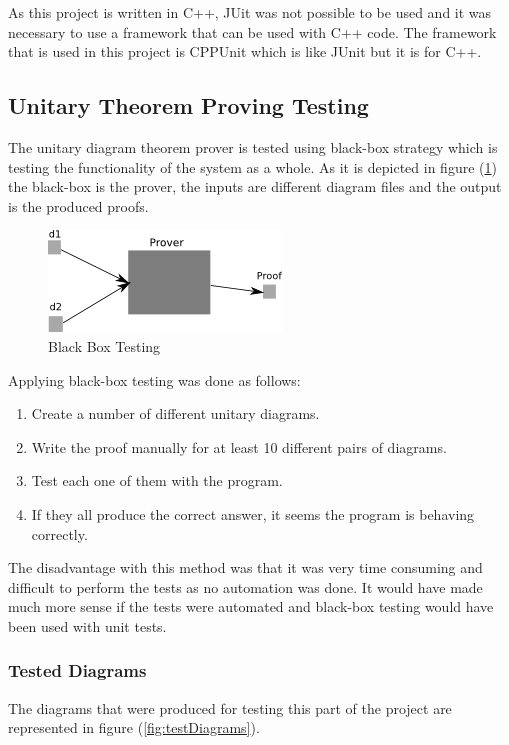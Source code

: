 \documentclass[10pt, a4paper, titlepage]{article}
\begin{document}
As this project is written in C++, JUit was not possible to be used and it was necessary to use a framework that can be used with C++ code. The framework that is used in this project is CPPUnit which is like JUnit but it is for C++.

\subsection{Unitary Theorem Proving Testing}
\label{unitary_testing}
The unitary diagram theorem prover is tested using black-box strategy which is testing the functionality of the system as a whole. As it is depicted in figure (\ref{fig:blackBox}) the black-box is the prover, the inputs are different diagram files and the output is the produced proofs.

\begin{figure}[h]
\centering
\includegraphics[scale=1.0]{images/blackbox.png}
\caption{Black Box Testing}
\label{fig:blackBox}
\end{figure}

Applying black-box testing was done as follows:
\begin{enumerate}
\item Create a number of different unitary diagrams.
\item Write the proof manually for at least 10 different pairs of diagrams.
\item Test each one of them with the program.
\item If they all produce the correct answer, it seems the program is behaving correctly.
\end{enumerate}

The disadvantage with this method was that it was very time consuming and difficult to perform the tests as no automation was done. It would have made much more sense if the tests were automated and black-box testing would have been used with unit tests.\\

\subsubsection{Tested Diagrams}
The diagrams that were produced for testing this part of the project are represented in figure (\ref{fig:testDiagrams}).
\end{document}
